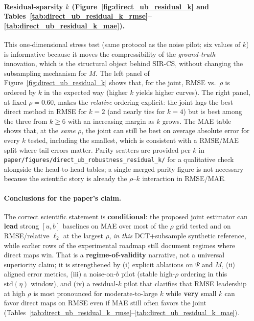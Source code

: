 \paragraph{Residual-sparsity $k$ (Figure~\ref{fig:direct_ub_residual_k} and Tables~\ref{tab:direct_ub_residual_k_rmse}--\ref{tab:direct_ub_residual_k_mae}).}
This one-dimensional stress test (same protocol as the noise pilot; six values of $k$) is informative because it moves the compressibility of the \emph{ground-truth} innovation, which is the structural object behind SIR-CS, without changing the subsampling mechanism for $M$. The left panel of Figure~\ref{fig:direct_ub_residual_k} shows that, for the joint, RMSE vs.\ $\rho$ is ordered by $k$ in the expected way (higher $k$ yields higher curves). The right panel, at fixed $\rho=0.60$, makes the \emph{relative} ordering explicit: the joint lags the best direct method in RMSE for $k=2$ (and nearly ties for $k=4$) but is best among the three from $k\ge 6$ with an increasing margin as $k$ grows. The MAE table shows that, at the \emph{same} $\rho$, the joint can still be best on average absolute error for every $k$ tested, including the smallest, which is consistent with a RMSE/MAE split where tail errors matter. Parity scatters are provided per $k$ in \texttt{paper/figures/direct\_ub\_robustness\_residual\_k/} for a qualitative check alongside the head-to-head tables; a single merged parity figure is not necessary because the scientific story is already the $\rho$--$k$ interaction in RMSE/MAE.

\paragraph{Conclusions for the paper's claim.}
The correct scientific statement is \textbf{conditional}: the proposed joint estimator can \textbf{lead} strong $[u,b]$ baselines on MAE over most of the $\rho$ grid tested and on RMSE/relative $\ell_2$ at the largest $\rho$, \emph{in this} DCT$+$subsample synthetic reference, while earlier rows of the experimental roadmap still document regimes where direct maps win. That is a \textbf{regime-of-validity} narrative, not a universal superiority claim; it is strengthened by (i) explicit ablations on $\Psi$ and $M$, (ii) aligned error metrics, (iii) a noise-on-$b$ pilot (stable high-$\rho$ ordering in this $\mathrm{std}(\eta)$ window), and (iv) a residual-$k$ pilot that clarifies that RMSE leadership at high $\rho$ is most pronounced for moderate-to-large $k$ while \textbf{very} small $k$ can favor direct maps on RMSE even if MAE still often favors the joint (Tables~\ref{tab:direct_ub_residual_k_rmse}--\ref{tab:direct_ub_residual_k_mae}).

